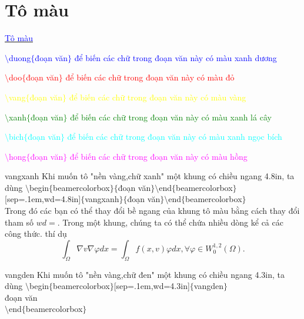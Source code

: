 \documentclass{beamer}
\newcommand{\hh}{\hspace*{.48in}}
\numberwithin{equation}{section}
\newcommand{\doo}[1]{\textcolor{red}{#1}}
\newcommand{\xanh}[1]{\textcolor{green}{#1}}
\newcommand{\duong}[1]{\textcolor{blue}{#1}}
\newcommand{\bich}[1]{\textcolor{cyan}{#1}}
\newcommand{\hong}[1]{\textcolor{magenta}{#1}}
\newcommand{\vang}[1]{\textcolor{yellow}{#1}}
\begin{document}
\section{Tô màu}
\begin{frame}
\underline{ \duong{\Large Tô màu}} %

\medskip

\duong{$\setminus$duong$\{$đoạn văn$\}$ để biến các chữ trong đoạn văn này có màu xanh dương}

\medskip

\doo{$\setminus$doo$\{$đoạn văn$\}$ để biến các chữ trong đoạn văn này có màu đỏ}

\medskip

\vang{ $\setminus$vang$\{$đoạn văn$\}$ để biến các chữ trong đoạn văn này có màu vàng}

\medskip

\xanh{ $\setminus$xanh$\{$đoạn văn$\}$ để biến các chữ trong đoạn văn này có màu xanh lá cây}

\medskip

\bich{ $\setminus$bich$\{$đoạn văn$\}$ để biến các chữ trong đoạn văn này có màu xanh ngọc bích}

\medskip

\hong{ $\setminus$hong$\{$đoạn văn$\}$ để biến các chữ trong đoạn văn này có màu hồng}
\medskip

\end{frame}


\begin{frame}

	\begin{beamercolorbox}[sep=.1em,wd=4.8in]{vangxanh}
  		Khi muốn tô "nền vàng,chữ xanh" một khung  có chiều ngang 4.8in, ta dùng $\setminus$begin$\{$beamercolorbox$\}\{$đoạn văn$\}\setminus$end$\{$beamercolorbox$\}$[sep=.1em,wd=4.8in]$\{$vangxanh$\}\{$đoạn văn$\}\setminus$end$\{$beamercolorbox$\}$\\
  		Trong đó các bạn có thể thay đổi bề ngang của khung tô màu bằng cách thay đổi tham số $wd=$. Trong một khung, chúng ta có thể chứa nhiều dòng kể cả các công thức. thí dụ \\
 \begin{equation}
\int_{\Omega}\nabla v\nabla\varphi dx=\int_{\Omega}f(x,v)\varphi dx,\forall\varphi\in W^{1,2}_0(\Omega).
\end{equation}
\end{beamercolorbox}

\medskip

\begin{beamercolorbox}[sep=.1em,wd=4.3in]{vangden}
  		Khi muốn tô "nền vàng,chữ đen" một khung  có chiều ngang 4.3in, ta dùng $\setminus$begin$\{$beamercolorbox$\}$[sep=.1em,wd=4.3in]$\{$vangden$\}$\\
  		\hh đoạn văn\\
  		$\setminus$end$\{$beamercolorbox$\}$	
\end{beamercolorbox}
\end{frame}
\end{document}
